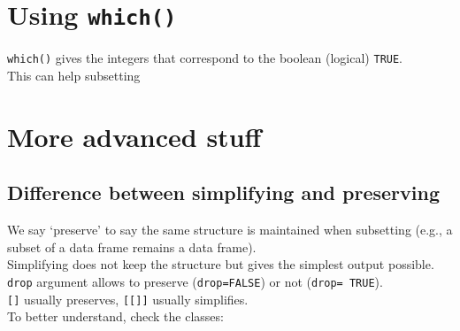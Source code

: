 \documentclass[]{book}
\newenvironment{Shaded}{}{}
\newcommand{\CommentTok}[1]{\textcolor[rgb]{0.38,0.63,0.69}{\textit{#1}}}
\newcommand{\DecValTok}[1]{\textcolor[rgb]{0.25,0.63,0.44}{#1}}
\newcommand{\KeywordTok}[1]{\textcolor[rgb]{0.00,0.44,0.13}{\textbf{#1}}}
\newcommand{\NormalTok}[1]{#1}
\newcommand{\OperatorTok}[1]{\textcolor[rgb]{0.40,0.40,0.40}{#1}}
\theoremstyle{definition}
\theoremstyle{definition}
\theoremstyle{definition}
\theoremstyle{remark}
\begin{document}
\hypertarget{using-which}{%
\section{\texorpdfstring{Using
\texttt{which()}}{Using which()}}\label{using-which}}

\texttt{which()} gives the integers that correspond to the boolean
(logical) \texttt{TRUE}.\\
This can help subsetting

\begin{Shaded}
\end{Shaded}

\hypertarget{more-advanced-stuff}{%
\section{More advanced stuff}\label{more-advanced-stuff}}

\hypertarget{difference-between-simplifying-and-preserving}{%
\subsection{Difference between simplifying and
preserving}\label{difference-between-simplifying-and-preserving}}

We say `preserve' to say the same structure is maintained when
subsetting (e.g., a subset of a data frame remains a data frame).\\
Simplifying does not keep the structure but gives the simplest output
possible.\\
\texttt{drop} argument allows to preserve (\texttt{drop=FALSE}) or not
(\texttt{drop=\ TRUE}).\\
\texttt{{[}{]}} usually preserves, \texttt{{[}{[}{]}{]}} usually
simplifies.\\
To better understand, check the classes:
\end{document}
